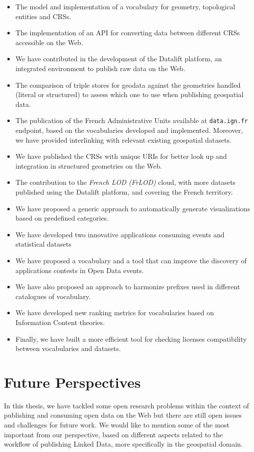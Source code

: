 \begin{itemize}
\item The model and implementation of a vocabulary for geometry, topological entities and CRSs.
\item The implementation of an API for converting data between different CRSs accessible on the Web.
\item We have contributed in the development of the Datalift platform, an integrated environment to publish raw data on the Web.
\item The comparison of triple stores for geodata against the geometries handled (literal or structured) to assess which one to use when publishing geospatial data. 
\item The publication of the French Administrative Units available at \texttt{data.ign.fr} endpoint, based on the vocabularies developed and implemented. Moreover, we have provided interlinking with relevant existing geospatial datasets.
\item We have published the CRSs with unique URIs for better look up and integration in structured geometries on the Web.
\item The contribution to the \textit{French LOD (FrLOD)} cloud, with more datasets published using the Datalift platform, and covering the French territory.
\item We have proposed a generic approach to automatically generate visualizations based on predefined categories.
\item We have developed two innovative applications consuming events and statistical datasets
\item We have proposed a vocabulary and a tool that can improve the discovery of applications contests in Open Data events.
\item We have also proposed an approach to harmonize prefixes used in different catalogues of vocabulary.
\item We have developed new ranking metrics for vocabularies based on Information Content theories.
\item Finally, we have built a more efficient tool for checking licenses compatibility between vocabularies and datasets.
\end{itemize}


\section{Future Perspectives}
\label{sec:future}

In this thesis, we have tackled some open research problems within the context of publishing and consuming open data on the Web but there are still open issues and challenges for future work. We would like to mention some of the most important from our perspective, based on different aspects related to the workflow of publishing Linked Data, more specifically in the geospatial domain. 

